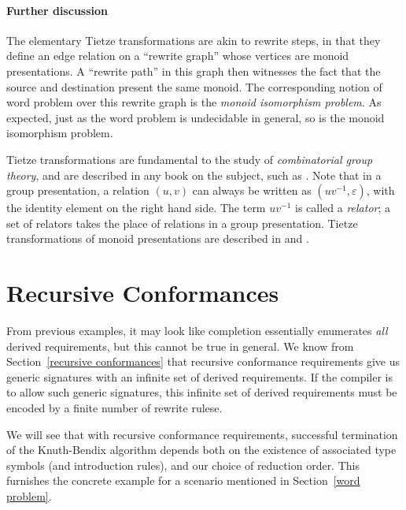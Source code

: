 \documentclass[../generics]{subfiles}
\begin{document}
\paragraph{Further discussion}
The elementary Tietze transformations are akin to rewrite steps, in that they define an edge relation on a ``rewrite graph'' whose vertices are monoid presentations. A ``rewrite path'' in this graph then witnesses the fact that the source and destination present the same monoid. The corresponding notion of word problem over this rewrite graph is the \emph{monoid isomorphism problem}. As expected, just as the word problem is undecidable in general, so is the monoid isomorphism problem.

Tietze transformations are fundamental to the study of \emph{combinatorial group theory}, and are described in any book on the subject, such as \cite{combinatorialgroup}. Note that in a group presentation, a relation $(u, v)$ can always be written as $(uv^{-1},\varepsilon)$, with the identity element on the right hand side. The term $uv^{-1}$ is called a \emph{relator}; a set of relators takes the place of relations in a group presentation. Tietze transformations of monoid presentations are described in \cite{book2012string} and \cite{henry2021tietze}.

\section{Recursive Conformances}\label{recursive conformances redux}

From previous examples, it may look like completion essentially enumerates \emph{all} derived requirements, but this cannot be true in general. We know from Section~\ref{recursive conformances} that recursive conformance requirements give us generic signatures with an infinite set of derived requirements. If the compiler is to allow such generic signatures, this infinite set of derived requirements must be encoded by a finite number of rewrite rulese.

We will see that with recursive conformance requirements, successful termination of the Knuth-Bendix algorithm depends both on the existence of associated type symbols (and introduction rules), and our choice of reduction order. This furnishes the concrete example for a scenario mentioned in Section~\ref{word problem}.
\end{document}
